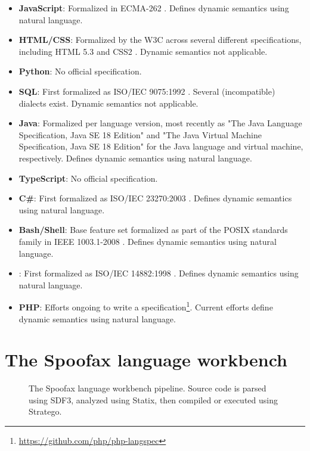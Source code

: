 \begin{itemize}
  \item \textbf{JavaScript}: Formalized in ECMA-262 \cite{ecma1999262}. Defines dynamic semantics using natural language.
  \item \textbf{HTML/CSS}: Formalized by the W3C across several different specifications, including HTML 5.3 \cite{Moon:21:H} and CSS2 \cite{Lilley:08:CSS}. Dynamic semantics not applicable.
  \item \textbf{Python}: No official specification.
  \item \textbf{SQL}: First formalized as ISO/IEC 9075:1992 \cite{ISO:1992:IITa}. Several (incompatible) dialects exist. Dynamic semantics not applicable.
  \item \textbf{Java}: Formalized per language version, most recently as "The Java Language Specification, Java SE 18 Edition" \cite{java_se_18} and "The Java Virtual Machine Specification, Java SE 18 Edition" \cite{jvm_se_18} for the Java language and virtual machine, respectively. Defines dynamic semantics using natural language.
  \item \textbf{TypeScript}: No official specification.
  \item \textbf{C\#}: First formalized as ISO/IEC 23270:2003 \cite{ISO:2003:IIIb}. Defines dynamic semantics using natural language.
  \item \textbf{Bash/Shell}: Base feature set formalized as part of the POSIX standards family in IEEE 1003.1-2008 \cite{8277153}. Defines dynamic semantics using natural language.
  \item \textbf{\Cplusplus}: First formalized as ISO/IEC 14882:1998 \cite{ISO:1998:IIP}. Defines dynamic semantics using natural language.
  \item \textbf{PHP}: Efforts ongoing to write a specification\footnote{\url{https://github.com/php/php-langspec}}. Current efforts define dynamic semantics using natural language.
\end{itemize}

\section{The Spoofax language workbench}
\label{sec:background_spoofax}

\begin{figure}
  \caption{The Spoofax language workbench pipeline. Source code is parsed using SDF3, analyzed using Statix, then compiled or executed using Stratego.}
  \label{fig:spoofax_pipeline}
\end{figure}

